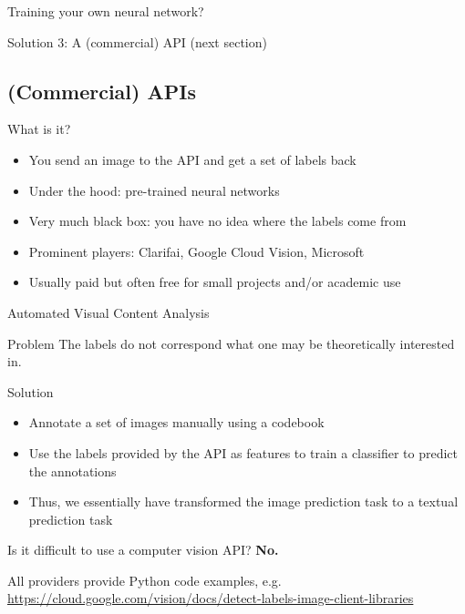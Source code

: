 \begin{frame}{Training your own neural network?}
  \begin{block}{Solution 3: A (commercial) API}
    (next section)
  \end{block}
\end{frame}

\subsection{(Commercial) APIs}

\begin{frame}{What is it?}
  \begin{itemize}
  \item You send an image to the API and get a set of labels back
  \item Under the hood: pre-trained neural networks
  \item Very much black box: you have no idea where the labels come from
  \item Prominent players: Clarifai, Google Cloud Vision, Microsoft
  \item Usually paid but often free for small projects and/or academic use
  \end{itemize}

\end{frame}


\begin{frame}{Automated Visual Content Analysis  \parencite{Araujo2020b}}
  \begin{alertblock}{Problem}
The labels do not correspond what one may be theoretically interested in.
  \end{alertblock}

  \pause
  
\begin{block}{Solution}
  \begin{itemize}
  \item Annotate a set of images manually using a codebook
  \item Use the labels provided by the API as features to train a classifier to predict the annotations
  \item Thus, we essentially have transformed the image prediction task to a textual prediction task
  \end{itemize}
\end{block}
\end{frame}



\begin{frame}{Is it difficult to use a computer vision API?}
  \textbf{No.}

All providers provide Python code examples, e.g. \url{https://cloud.google.com/vision/docs/detect-labels-image-client-libraries}
  
\end{frame}

